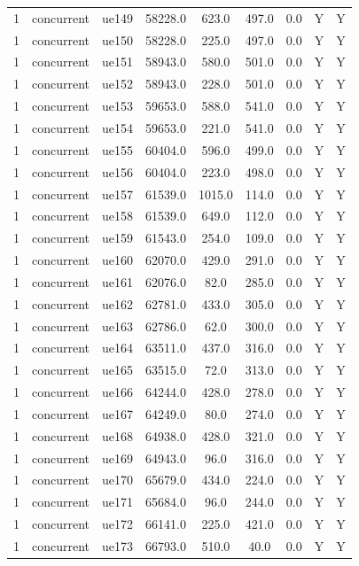 \begin{table}[ht]
\begin{tabular}{|c|c|c|c|c|c|c|c|c|}
1 & concurrent & ue149 & 58228.0 & 623.0 & 497.0 & 0.0 & Y & Y \\
1 & concurrent & ue150 & 58228.0 & 225.0 & 497.0 & 0.0 & Y & Y \\
1 & concurrent & ue151 & 58943.0 & 580.0 & 501.0 & 0.0 & Y & Y \\
1 & concurrent & ue152 & 58943.0 & 228.0 & 501.0 & 0.0 & Y & Y \\
1 & concurrent & ue153 & 59653.0 & 588.0 & 541.0 & 0.0 & Y & Y \\
1 & concurrent & ue154 & 59653.0 & 221.0 & 541.0 & 0.0 & Y & Y \\
1 & concurrent & ue155 & 60404.0 & 596.0 & 499.0 & 0.0 & Y & Y \\
1 & concurrent & ue156 & 60404.0 & 223.0 & 498.0 & 0.0 & Y & Y \\
1 & concurrent & ue157 & 61539.0 & 1015.0 & 114.0 & 0.0 & Y & Y \\
1 & concurrent & ue158 & 61539.0 & 649.0 & 112.0 & 0.0 & Y & Y \\
1 & concurrent & ue159 & 61543.0 & 254.0 & 109.0 & 0.0 & Y & Y \\
1 & concurrent & ue160 & 62070.0 & 429.0 & 291.0 & 0.0 & Y & Y \\
1 & concurrent & ue161 & 62076.0 & 82.0 & 285.0 & 0.0 & Y & Y \\
1 & concurrent & ue162 & 62781.0 & 433.0 & 305.0 & 0.0 & Y & Y \\
1 & concurrent & ue163 & 62786.0 & 62.0 & 300.0 & 0.0 & Y & Y \\
1 & concurrent & ue164 & 63511.0 & 437.0 & 316.0 & 0.0 & Y & Y \\
1 & concurrent & ue165 & 63515.0 & 72.0 & 313.0 & 0.0 & Y & Y \\
1 & concurrent & ue166 & 64244.0 & 428.0 & 278.0 & 0.0 & Y & Y \\
1 & concurrent & ue167 & 64249.0 & 80.0 & 274.0 & 0.0 & Y & Y \\
1 & concurrent & ue168 & 64938.0 & 428.0 & 321.0 & 0.0 & Y & Y \\
1 & concurrent & ue169 & 64943.0 & 96.0 & 316.0 & 0.0 & Y & Y \\
1 & concurrent & ue170 & 65679.0 & 434.0 & 224.0 & 0.0 & Y & Y \\
1 & concurrent & ue171 & 65684.0 & 96.0 & 244.0 & 0.0 & Y & Y \\
1 & concurrent & ue172 & 66141.0 & 225.0 & 421.0 & 0.0 & Y & Y \\
1 & concurrent & ue173 & 66793.0 & 510.0 & 40.0 & 0.0 & Y & Y \\

\end{tabular}
\end{table}
